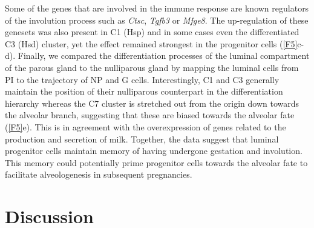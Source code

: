 \documentclass[titlepage, 12pt, oneside]{amsart}
\begin{document}
Some of the genes that are involved in the immune response are known regulators of the involution process such as \textit{Ctsc}, \textit{Tgfb3} or \textit{Mfge8}\autocite{Clarkson2003}.
The up-regulation of these genesets was also present in C1 (Hsp) and in some cases even the differentiated C3 (Hsd) cluster, yet the effect remained strongest in the progenitor cells (\autoref{F5}c-d).
Finally, we compared the differentiation processes of the luminal compartment of the parous gland to the nulliparous gland by mapping the luminal cells from PI to the trajectory of NP and G cells.
Interestingly, C1 and C3 generally maintain the position of their nulliparous counterpart in the differentiation hierarchy whereas the C7 cluster is stretched out from the origin down towards the alveolar branch, suggesting that these are biased towards the alveolar fate (\autoref{F5}e).
This is in agreement with the overexpression of genes related to the production and secretion of milk.
Together, the data suggest that luminal progenitor cells maintain memory of having undergone gestation and involution.
This memory could potentially prime progenitor cells towards the alveolar fate to facilitate alveologenesis in subsequent pregnancies.

\section{Discussion}
\end{document}
